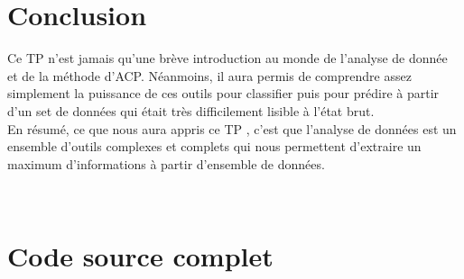 \documentclass[11pt,oneside]{article}
\begin{document}
\section{Conclusion}
Ce TP n’est jamais qu'une brève introduction au monde de l'analyse de donnée et de la méthode d'ACP. Néanmoins, il aura permis de comprendre assez simplement la puissance de ces outils pour classifier puis pour prédire à partir d'un set de données qui était très difficilement lisible à l'état brut.\\

En résumé, ce que nous aura appris ce TP , c'est que l'analyse de données est un ensemble d'outils complexes et complets qui nous permettent d'extraire un maximum d'informations à partir d'ensemble de données.

	~\newpage{}
	\appendix
	\appendixpage
	\addappheadtotoc
	
\label{MatLab:Annexe}
\section{Code source complet}

\end{document}

